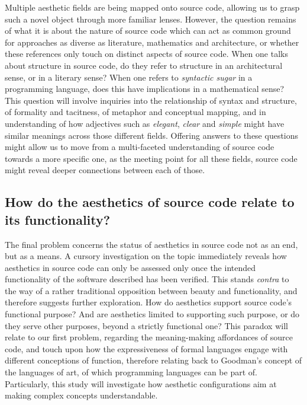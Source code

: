 Multiple aesthetic fields are being mapped onto source code, allowing us to grasp such a novel object through more familiar lenses. However, the question remains of what it is about the nature of source code which can act as common ground for approaches as diverse as literature, mathematics and architecture, or whether these references only touch on distinct aspects of source code. When one talks about structure in source code, do they refer to structure in an architectural sense, or in a literary sense? When one refers to \emph{syntactic sugar} in a programming language, does this have implications in a mathematical sense? This question will involve inquiries into the relationship of syntax and structure, of formality and tacitness,  of metaphor and conceptual mapping, and in understanding of how adjectives such as \emph{elegant}, \emph{clear} and \emph{simple} might have similar meanings across those different fields. Offering answers to these questions might allow us to move from a multi-faceted understanding of source code towards a more specific one, as the meeting point for all these fields, source code might reveal deeper connections between each of those.

\subsection{How do the aesthetics of source code relate to its functionality?}
\label{subsec:research-question-3}

The final problem concerns the status of aesthetics in source code not as an end, but as a means. A cursory investigation on the topic immediately reveals how aesthetics in source code can only be assessed only once the intended functionality of the software described has been verified. This stands \emph{contra} to the way of a rather traditional opposition between beauty and functionality, and therefore suggests further exploration. How do aesthetics support source code's functional purpose? And are aesthetics limited to supporting such purpose, or do they serve other purposes, beyond a strictly functional one? This paradox will relate to our first problem, regarding the meaning-making affordances of source code, and touch upon how the expressiveness of formal languages engage with different conceptions of function, therefore relating back to Goodman's concept of the languages of art, of which programming languages can be part of. Particularly, this study will investigate how aesthetic configurations aim at making complex concepts understandable.

